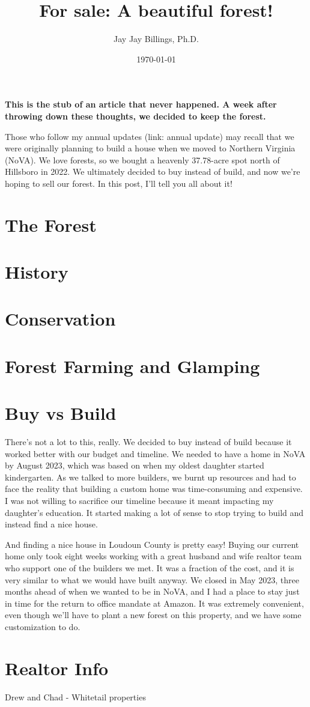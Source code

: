 \documentclass{article}
\title{For sale: A beautiful forest!}
\author{Jay Jay Billings, Ph.D.}
\date{\today}
\begin{document}
\maketitle

\textbf{This is the stub of an article that never happened. A week after throwing down these thoughts, we decided to keep the forest.}\newpage

Those who follow my annual updates (link: annual update) may recall that we were originally planning to build a house when we moved to Northern Virginia (NoVA). We love forests, so we bought a heavenly 37.78-acre spot north of Hillsboro in 2022. We ultimately decided to buy instead of build, and now we're hoping to sell our forest. In this post, I'll tell you all about it! 

\section*{The Forest}

\section*{History}

\section*{Conservation}

\section*{Forest Farming and Glamping}

\section*{Buy vs Build}

There's not a lot to this, really. We decided to buy instead of build because it worked better with our budget and timeline. We needed to have a home in NoVA by August 2023, which was based on when my oldest daughter started kindergarten. As we talked to more builders, we burnt up resources and had to face the reality that building a custom home was time-consuming and expensive. I was not willing to sacrifice our timeline because it meant impacting my daughter's education. It started making a lot of sense to stop trying to build and instead find a nice house. 

And finding a nice house in Loudoun County is pretty easy! Buying our current home only took eight weeks working with a great husband and wife realtor team who support one of the builders we met. It was a fraction of the cost, and it is very similar to what we would have built anyway. We closed in May 2023, three months ahead of when we wanted to be in NoVA, and I had a place to stay just in time for the return to office mandate at Amazon. It was extremely convenient, even though we'll have to plant a new forest on this property, and we have some customization to do. 

\section*{Realtor Info}

Drew and Chad - Whitetail properties
\end{document}
